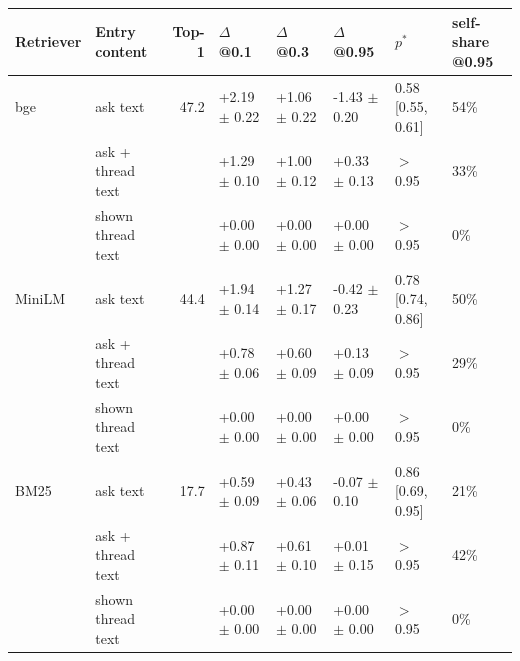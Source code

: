 \begin{tabular}{llrlllll}\toprule Retriever & Entry content & Top-1 & $\Delta$@0.1 & $\Delta$@0.3 & $\Delta$@0.95 & $p^*$ & self-share @0.95\\\midrule
bge & ask text & 47.2 & +2.19 $\pm$ 0.22 & +1.06 $\pm$ 0.22 & -1.43 $\pm$ 0.20 & 0.58 [0.55, 0.61] & 54\%\\
 & ask + thread text &  & +1.29 $\pm$ 0.10 & +1.00 $\pm$ 0.12 & +0.33 $\pm$ 0.13 & $>$0.95 & 33\%\\
 & shown thread text &  & +0.00 $\pm$ 0.00 & +0.00 $\pm$ 0.00 & +0.00 $\pm$ 0.00 & $>$0.95 & 0\%\\
\addlinespace[2pt]
MiniLM & ask text & 44.4 & +1.94 $\pm$ 0.14 & +1.27 $\pm$ 0.17 & -0.42 $\pm$ 0.23 & 0.78 [0.74, 0.86] & 50\%\\
 & ask + thread text &  & +0.78 $\pm$ 0.06 & +0.60 $\pm$ 0.09 & +0.13 $\pm$ 0.09 & $>$0.95 & 29\%\\
 & shown thread text &  & +0.00 $\pm$ 0.00 & +0.00 $\pm$ 0.00 & +0.00 $\pm$ 0.00 & $>$0.95 & 0\%\\
\addlinespace[2pt]
BM25 & ask text & 17.7 & +0.59 $\pm$ 0.09 & +0.43 $\pm$ 0.06 & -0.07 $\pm$ 0.10 & 0.86 [0.69, 0.95] & 21\%\\
 & ask + thread text &  & +0.87 $\pm$ 0.11 & +0.61 $\pm$ 0.10 & +0.01 $\pm$ 0.15 & $>$0.95 & 42\%\\
 & shown thread text &  & +0.00 $\pm$ 0.00 & +0.00 $\pm$ 0.00 & +0.00 $\pm$ 0.00 & $>$0.95 & 0\%\\
\bottomrule\end{tabular}